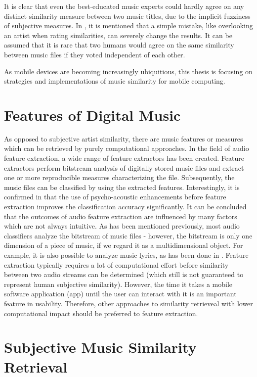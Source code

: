 It is clear that even the best-educated music experts could hardly agree on 
any distinct similarity measure between two music titles, due to the implicit fuzziness of subjective measures. In \cite{Ellis02thequest}, it is mentioned that a simple mistake, like overlooking an artist when rating similarities, can severely change the results. It can be assumed that it is rare that two humans would agree on the same similarity between music files
if they voted independent of each other.

As mobile devices are becoming increasingly ubiquitious, this thesis is focusing on strategies and implementations of music similarity for mobile computing.

\section{Features of Digital Music}

As opposed to subjective artist similarity, there are music features or measures which can be retrieved by purely computational approaches. In the field of audio feature extraction, a wide range of feature extractors has been created. Feature extractors perform bitstream analysis of digitally stored music files and extract one or more reproducible measures characterizing the file. Subsequently, the music files can be classified by using the extracted features. Interestingly, it is confirmed in \cite{LID-05ismir} that the use of psycho-acoustic enhancements before feature extraction improves the classification accuracy significantly. It can be concluded that the outcomes of audio feature extraction are influenced by many factors which are not always intuitive.
As has been mentioned previously, most audio classifiers analyze the bitstream of music files - however, the bitstream is only one dimension of a piece of music, if we regard it as a multidimensional object. For example, it is also possible to analyze music lyrics, as has been done in \cite{DBLP:conf/ismir/MayerNR08}. Feature extraction typically requires a lot of computational effort before similarity between two audio streams can be determined (which still is not guaranteed to represent human subjective similarity). However, the time it takes a mobile software application (app) until the user can interact with it is an important feature in usability. Therefore, other approaches to similarity retrieveal with lower computational impact should be preferred to feature extraction.

\section{Subjective Music Similarity Retrieval}

